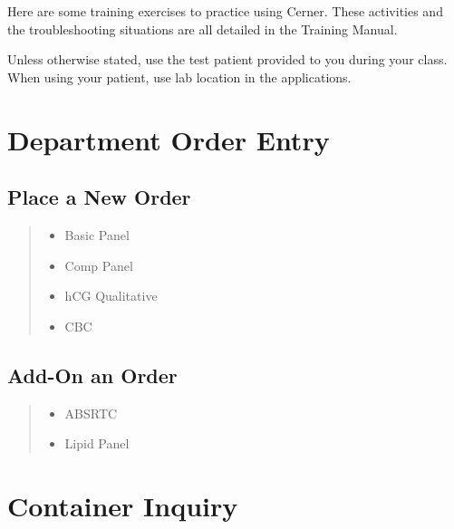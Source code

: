 \setcounter{page}{1}

Here are some training exercises to practice using Cerner. These activities and the troubleshooting situations are all detailed in the Training Manual.

Unless otherwise stated, use the test patient provided to you during your class. When using your patient, use  lab location in the applications.

\section{Department Order Entry}

    \subsection{Place a New Order}



    \begin{quote}
        \begin{itemize}
            \item Basic Panel
            \item Comp Panel
            \item hCG Qualitative
            \item CBC
        \end{itemize}
    \end{quote}


    \subsection{Add-On an Order}


        \begin{quote}
        \begin{itemize}
            \item ABSRTC
            \item Lipid Panel
        \end{itemize}
        \end{quote}


\section{Container Inquiry}

